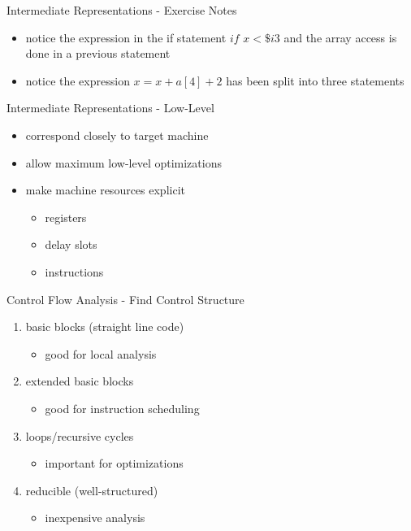 \documentclass[mcgill,slideColor,colorBG,pdf]{prosper}
\begin{document}
\begin{slide} {Intermediate Representations - Exercise Notes}
\begin{itemize}
\item notice the expression in the if statement $if$ $x < \$i3$ and the array access is done in a previous statement
\item notice the expression $x = x + a[4] + 2$ has been split into three statements
\end{itemize}
\end{slide}

\begin{slide} {Intermediate Representations - Low-Level}
\begin{itemize}
\item correspond closely to target machine
\item allow maximum low-level optimizations
\item make machine resources explicit
\begin{itemize}
\item registers
\item delay slots
\item instructions
\end{itemize}
\end{itemize}
\end{slide}

\begin{slide} {Control Flow Analysis - Find Control Structure}
\begin{enumerate}
\item basic blocks (straight line code)
\begin{itemize}
\item good for local analysis
\end{itemize}
\item extended basic blocks
\begin{itemize}
\item good for instruction scheduling
\end{itemize}
\item loops/recursive cycles
\begin{itemize}
\item important for optimizations
\end{itemize}
\item reducible (well-structured)
\begin{itemize}
\item inexpensive analysis
\end{itemize}

\end{enumerate}
\end{slide}
\end{document}
